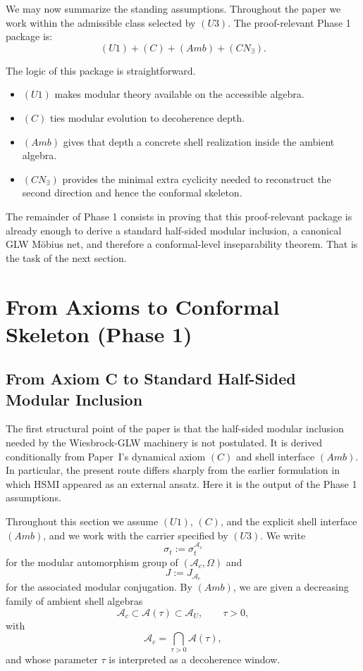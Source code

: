 \documentclass[12pt]{article}
\theoremstyle{definition}
\theoremstyle{remark}
\newcommand{\tightlist}{%
  \setlength{\itemsep}{0pt}\setlength{\parskip}{0pt}}
\begin{document}
We may now summarize the standing assumptions. Throughout the paper we
work within the admissible class selected by \((U3)\). The
proof-relevant Phase 1 package is: \[
(U1)+(C)+(Amb)+(CN_\exists).
\]

The logic of this package is straightforward.

\begin{itemize}
\tightlist
\item
  \((U1)\) makes modular theory available on the accessible algebra.
\item
  \((C)\) ties modular evolution to decoherence depth.
\item
  \((Amb)\) gives that depth a concrete shell realization inside the
  ambient algebra.
\item
  \((CN_\exists)\) provides the minimal extra cyclicity needed to
  reconstruct the second direction and hence the conformal skeleton.
\end{itemize}

The remainder of Phase 1 consists in proving that this proof-relevant
package is
already enough to derive a standard half-sided modular inclusion, a
canonical GLW Möbius net, and therefore a conformal-level inseparability
theorem. That is the task of the next section.

\section{From Axioms to Conformal Skeleton (Phase
1)}\label{from-axioms-to-conformal-skeleton-phase-1}

\subsection{From Axiom C to Standard Half-Sided Modular
Inclusion}\label{from-axiom-c-to-standard-half-sided-modular-inclusion}

The first structural point of the paper is that the half-sided modular
inclusion needed by the Wiesbrock-GLW machinery is not postulated. It is
derived conditionally from Paper~I's dynamical axiom \((C)\) and shell
interface \((Amb)\). In particular, the present route differs sharply
from the earlier formulation in which HSMI appeared as an external
ansatz. Here it is the output of the Phase 1 assumptions.

Throughout this section we assume \((U1)\), \((C)\), and the explicit
shell interface \((Amb)\), and we work with the carrier specified by
\((U3)\). We write \[
\sigma_t := \sigma_t^{\mathcal{A}_c}
\] for the modular automorphism group of \((\mathcal{A}_c,\Omega)\) and
\[
J := J_{\mathcal{A}_c}
\] for the associated modular conjugation. By \((Amb)\), we are given a
decreasing family of ambient shell algebras \[
\mathcal{A}_c \subset \mathcal{A}(\tau) \subset \mathcal{A}_U,
\qquad
\tau>0,
\] with \[
\mathcal{A}_c=\bigcap_{\tau>0}\mathcal{A}(\tau),
\] and whose parameter \(\tau\) is interpreted as a decoherence window.
\end{document}
